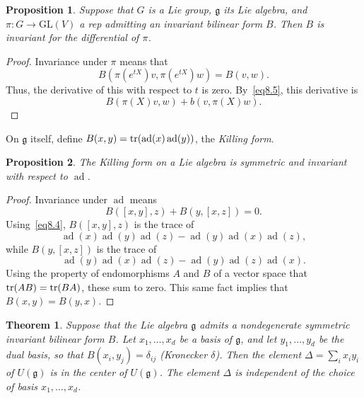 \documentclass[12pt,reqno]{book}%
\newtheorem{theorem}{Theorem}[chapter]
\newtheorem{proposition}{Proposition}[chapter]
\theoremstyle{definition}
\theoremstyle{remark}
\theoremstyle{theorem}
\theoremstyle{remark}
\DeclareMathOperator{\ad}{ad}
\begin{document}
\begin{proposition}\label{prop10.2}%
    Suppose that $G$ is a Lie group, $\mathfrak{g}$ its Lie algebra, and $\pi : G \to \mathrm{GL}(V)$ a rep admitting an invariant bilinear form $B$.
    Then $B$ is invariant for the differential of $\pi$.
\end{proposition}%
\begin{proof}%
    Invariance under $\pi$ means that
    \[
        B(\pi(e^{tX})v, \pi(e^{tX})w) = B(v, w).
    \]
    Thus, the derivative of this with respect to $t$ is zero.
    By~\eqref{eq8.5}, this derivative is
    \[
        B(\pi(X)v, w) + b(v, \pi(X)w).
    \]
\end{proof}%

On $\mathfrak{g}$ itself, define $B(x, y) =  \tr(\ad(x)\ad(y))$, the \emph{Killing form}.

\begin{proposition}\label{prop10.3}%
    The Killing form on a Lie algebra is symmetric and invariant with respect to $\ad$.
\end{proposition}%
\begin{proof}%
    Invariance under $\ad$ means
    \begin{equation}\label{eq10.1}
        B([x, y], z) + B(y, [x, z]) = 0.
    \end{equation}
    Using~\eqref{eq8.4}, $B([x, y], z)$ is the trace of
    \[
        \ad(x)\ad(y)\ad(z) - \ad(y)\ad(x)\ad(z),
    \]
    while $B(y, [x, z])$ is the trace of
    \[
        \ad(y)\ad(x)\ad(z) - \ad(y)\ad(z)\ad(x).
    \]
    Using the property of endomorphisms $A$ and $B$ of a vector space that $\tr(AB) = \tr(BA)$, these sum to zero.
    This same fact implies that $B(x, y) = B(y, x)$.
\end{proof}%

\begin{theorem}\label{thm10.2}%
    Suppose that the Lie algebra $\mathfrak{g}$ admits a nondegenerate symmetric invariant bilinear form $B$.
    Let $x_1, \ldots, x_d$ be a basis of $\mathfrak{g}$, and let $y_1, \ldots, y_d$ be the dual basis, so that $B(x_i, y_j) = \delta_{ij}$ (Kronecker $\delta$).
    Then the element $\Delta = \sum_{i} x_iy_i$ of $U(\mathfrak{g})$ is in the center of $U(\mathfrak{g})$.
    The element $\Delta$ is independent of the choice of basis $x_1, \ldots, x_d$.
\end{theorem}%
\end{document}
